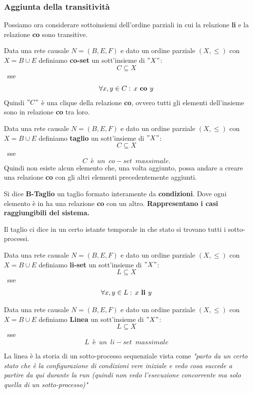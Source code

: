 \subsubsection{Aggiunta della transitività}
Possiamo ora considerare sottoinsiemi dell'ordine parziali in cui la relazione
\textbf{li} e la relazione \textbf{co} sono transitive.
\begin{definizione}
  Data una rete causale $N=(B, E, F)$ e dato un ordine parziale $(X, \leq)$ con
  $X=B\cup E$ definiamo \textbf{co-set} un sott'insieme di $"X"$:
  \[C\subseteq X\]\mbox{ sse} \[\forall x, y\in C:\, x\mbox{ \textbf{co }}y\]
    Quindi $"C"$ è una clique della relazione \textbf{co}, ovvero tutti gli elementi dell'insieme sono in relazione \textbf{co} tra loro.
\end{definizione} \vspace{5mm} %
\begin{definizione}
 Data una rete causale $N=(B, E, F)$ e dato un ordine parziale $(X, \leq)$ con
  $X=B\cup E$ definiamo \textbf{taglio} un sott'insieme di $"X"$:
        \[C\subseteq X\]\mbox{ sse }\[C\,\,\,è\,\,\,un\,\,\,co-set\,\,\,massimale.\] Quindi non esiste alcun elemento che, una volta aggiunto, possa andare a creare una relazione \textbf{co} con gli altri elementi precedentemente aggiunti.
        \begin{corollario}
         Si dice \textbf{B-Taglio} un taglio formato interamente da \textbf{condizioni}. Dove ogni elemento è in ha una relazione \textbf{co} con un altro. \textbf{Rappresentano i casi raggiungibili del sistema.}
        \end{corollario}
        \begin{corollario}
         Il taglio ci dice in un certo istante temporale in che stato si trovano tutti i sotto-processi.
        \end{corollario}
 \end{definizione} \vspace{5mm} %
 \begin{definizione}
 Data una rete causale $N=(B, E, F)$ e dato un ordine parziale $(X, \leq)$ con
  $X=B\cup E$ definiamo \textbf{li-set} un sott'insieme di $"X"$:
        \[L\subseteq X\]\mbox{ sse }\[ \forall x, y\in L:\, x\mbox{ \textbf{li }}y\]
\end{definizione} \vspace{5mm} %
 \begin{definizione}
 Data una rete causale $N=(B, E, F)$ e dato un ordine parziale $(X, \leq)$ con
  $X=B\cup E$ definiamo \textbf{Linea} un sott'insieme di $"X"$:
        \[L\subseteq X\]\mbox{ sse }\[ L\,\,\,è\,\,\, un\,\,\, li-set\,\,\, massimale\]
        \begin{corollario}
         La linea è la storia di un sotto-processo sequenziale vista come \textit{"parto da un certo stato che è la configurazione di condizioni vere iniziale e vedo cosa succede a partire da qui durante la run (quindi non vedo l'esecuzione concorrente ma solo quella di un sotto-processo)"}
        \end{corollario}
\end{definizione} \vspace{5mm} %
